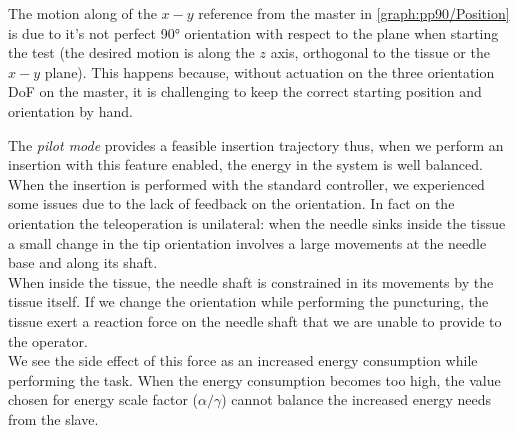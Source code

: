 The motion along of the $x-y$ reference from the master in \figurename{ \ref{graph:pp90/Position}} is due to it's not perfect 90° orientation with respect to the plane when starting the test (the desired motion is along the $z$ axis, orthogonal to the tissue or the $x-y$ plane). This happens because, without actuation on the three orientation DoF on the master, it is challenging to keep the correct starting position and orientation by hand.

The \textit{pilot mode} provides a feasible insertion trajectory thus, when we perform an insertion with this feature enabled, the energy in the system is well balanced.
When the insertion is performed with the standard controller, we experienced some issues due to the lack of feedback on the orientation.
In fact on the orientation the teleoperation is unilateral: when the needle sinks inside the tissue a small change in the tip orientation involves a large movements at the needle base and along its shaft.\\
When inside the tissue, the needle shaft is constrained in its movements by the tissue itself. If we change the orientation while performing the puncturing, the tissue exert a reaction force on the needle shaft that we are unable to provide to the operator.\\
We see the side effect of this force as an increased energy consumption while performing the task.
When the energy consumption becomes too high, the value chosen for energy scale factor ($\alpha/\gamma$) cannot balance the increased energy needs from the slave.

